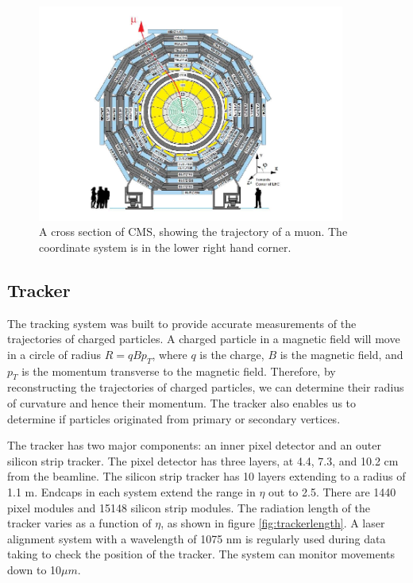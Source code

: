 \documentclass[oneside, letterpaper, oldfontcommands]{memoir}
\begin{document}
\begin{figure}[here]
\includegraphics[width=0.9\textwidth]{CMSview.png}
\caption{A cross section of CMS, showing the trajectory of a muon. The coordinate system is in the lower right hand corner. \cite{Chatrchyan:2009hg}}
\label{fig:cmscoord}
\end{figure}

\subsection{Tracker}\label{tracker}

\qquad The tracking system was built to provide accurate measurements of the trajectories of charged particles.  A charged particle in a magnetic field will move in a circle of radius $R = qBp_{T}$, where $q$ is the charge, $B$ is the magnetic field, and $p_{T}$ is the momentum transverse to the magnetic field. Therefore, by reconstructing the trajectories of charged particles, we can determine their radius of curvature and hence their momentum. The tracker also enables us to determine if particles originated from primary or secondary vertices.

\qquad The tracker has two major components: an inner pixel detector and an outer silicon strip tracker. The pixel detector has three layers, at 4.4, 7.3, and 10.2 cm from the beamline. The silicon strip tracker has 10 layers extending to a radius of 1.1 m. Endcaps in each system extend the range in $\eta$ out to 2.5. There are 1440 pixel modules and 15148 silicon strip modules. The radiation length of the tracker varies as a function of $\eta$, as shown in figure \ref{fig:trackerlength}. A laser alignment system with a wavelength of 1075 nm is regularly used during data taking to check the position of the tracker. The system can monitor movements down to 10$\mu m$. 
\end{document}
